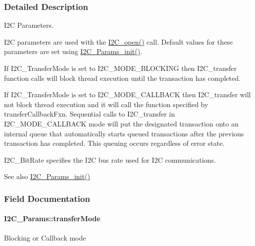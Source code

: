 \subsubsection{Detailed Description}
I2\+C Parameters. 

I2\+C parameters are used with the \hyperlink{_i2_c_8h_ae1aa99e1fee4517406018e10025cca0e}{I2\+C\+\_\+open()} call. Default values for these parameters are set using \hyperlink{_i2_c_8h_ab11636302074d67180207ab81ceb323c}{I2\+C\+\_\+\+Params\+\_\+init()}.

If I2\+C\+\_\+\+Transfer\+Mode is set to I2\+C\+\_\+\+M\+O\+D\+E\+\_\+\+B\+L\+O\+C\+K\+I\+N\+G then I2\+C\+\_\+transfer function calls will block thread execution until the transaction has completed.

If I2\+C\+\_\+\+Transfer\+Mode is set to I2\+C\+\_\+\+M\+O\+D\+E\+\_\+\+C\+A\+L\+L\+B\+A\+C\+K then I2\+C\+\_\+transfer will not block thread execution and it will call the function specified by transfer\+Callback\+Fxn. Sequential calls to I2\+C\+\_\+transfer in I2\+C\+\_\+\+M\+O\+D\+E\+\_\+\+C\+A\+L\+L\+B\+A\+C\+K mode will put the designated transaction onto an internal queue that automatically starts queued transactions after the previous transaction has completed. This queuing occurs regardless of error state.

I2\+C\+\_\+\+Bit\+Rate specifies the I2\+C bus rate used for I2\+C communications.

\begin{DoxySeeAlso}{See also}
\hyperlink{_i2_c_8h_ab11636302074d67180207ab81ceb323c}{I2\+C\+\_\+\+Params\+\_\+init()} 
\end{DoxySeeAlso}


\subsubsection{Field Documentation}
\paragraph[{transfer\+Mode}]{ I2\+C\+\_\+\+Params\+::transfer\+Mode}\label{struct_i2_c___params_a79c5c51380ffbdb21df1dff6cb57de0e}
Blocking or Callback mode 
